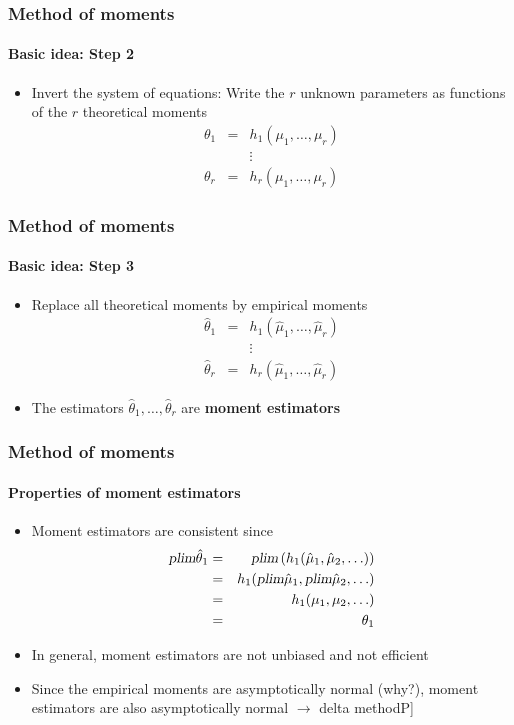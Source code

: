 \documentclass[notes=show]{beamer}
\begin{document}
\begin{frame}\frametitle{Method of moments}\framesubtitle{Basic idea: Step 2}
\begin{itemize}
    \item Invert the system of equations: \newline
    Write the $r$ unknown parameters \newline
    as functions of the $r$ theoretical moments%
    \begin{eqnarray*}
    \theta _{1} &=&h_{1}(\mu _{1},\ldots ,\mu _{r}) \\
    &&\vdots \\
    \theta _{r} &=&h_{r}(\mu _{1},\ldots ,\mu _{r})
    \end{eqnarray*}
\end{itemize}
\end{frame}

\begin{frame}\frametitle{Method of moments}\framesubtitle{Basic idea: Step 3}
\begin{itemize}
    \item Replace all theoretical moments by empirical moments
    \begin{eqnarray*}
        \hat{\theta}_{1} &=&h_{1}(\hat{\mu}_{1},\ldots ,\hat{\mu}_{r}) \\
        &&\vdots \\
        \hat{\theta}_{r} &=&h_{r}(\hat{\mu}_{1},\ldots ,\hat{\mu}_{r})
    \end{eqnarray*}
    \item The estimators $\hat{\theta}_{1},\ldots ,\hat{\theta}_{r}$ are \textbf{moment estimators}
\end{itemize}
\end{frame}

\begin{frame}\frametitle{Method of moments}\framesubtitle{Properties of moment estimators}
\begin{itemize}
    \item Moment estimators are consistent since%
    \begin{eqnarray*}
        \textsl{plim}\hat{\theta}_{1} &=&\textsl{plim}\left( h_{1}(\hat{\mu}_{1},%
        \hat{\mu}_{2},\ldots )\right) \\
        &=&h_{1}(\textsl{plim}\hat{\mu}_{1},\textsl{plim}\hat{\mu}_{2},\ldots ) \\
        &=&h_{1}(\mu _{1},\mu _{2},\ldots ) \\
        &=&\theta _{1}
    \end{eqnarray*}
    \item In general, moment estimators are not unbiased and not efficient
    \item Since the empirical moments are asymptotically normal (why?), moment
    estimators are also asymptotically normal\newline
    $\longrightarrow $ delta method\hfill \lbrack P]
\end{itemize}
\end{frame}
\end{document}

